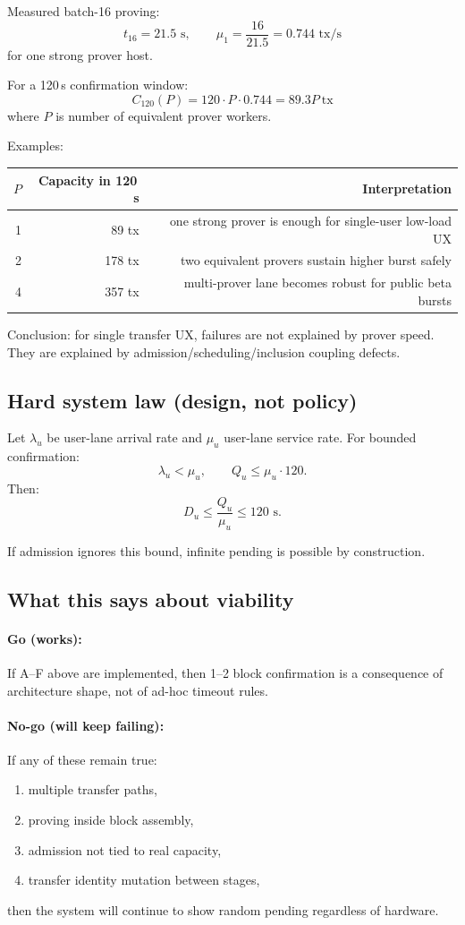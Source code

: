 \documentclass[11pt]{article}
\begin{document}
Measured batch-16 proving:
\[
t_{16}=21.5\text{ s},\qquad
\mu_1=\frac{16}{21.5}=0.744\text{ tx/s}
\]
for one strong prover host.

For a 120\,s confirmation window:
\[
C_{120}(P)=120\cdot P\cdot 0.744
          =89.3P\ \text{tx}
\]
where $P$ is number of equivalent prover workers.

Examples:
\begin{center}
\begin{tabular}{@{}rrr@{}}
\toprule
$P$ & Capacity in 120\,s & Interpretation \\
\midrule
1 & 89 tx & one strong prover is enough for single-user low-load UX \\
2 & 178 tx & two equivalent provers sustain higher burst safely \\
4 & 357 tx & multi-prover lane becomes robust for public beta bursts \\
\bottomrule
\end{tabular}
\end{center}

Conclusion: for single transfer UX, failures are not explained by prover speed.
They are explained by admission/scheduling/inclusion coupling defects.

\subsection{Hard system law (design, not policy)}

Let $\lambda_u$ be user-lane arrival rate and $\mu_u$ user-lane service rate.
For bounded confirmation:
\[
\lambda_u < \mu_u,\qquad
Q_u \le \mu_u\cdot 120.
\]
Then:
\[
D_u \le \frac{Q_u}{\mu_u}\le 120\text{ s}.
\]

If admission ignores this bound, infinite pending is possible by construction.

\subsection{What this says about viability}

\paragraph{Go (works):}
If A--F above are implemented, then 1--2 block confirmation is a consequence of
architecture shape, not of ad-hoc timeout rules.

\paragraph{No-go (will keep failing):}
If any of these remain true:
\begin{enumerate}[leftmargin=2em]
  \item multiple transfer paths,
  \item proving inside block assembly,
  \item admission not tied to real capacity,
  \item transfer identity mutation between stages,
\end{enumerate}
then the system will continue to show random pending regardless of hardware.
\end{document}
